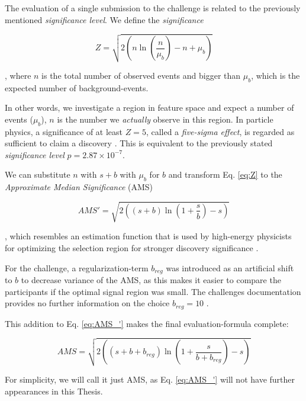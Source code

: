The evaluation of a single submission to the challenge is related to the previously mentioned \emph{significance level}.
We define the \emph{significance}

\begin{equation}\label{eq:Z}
	Z = \sqrt{2 \left(n \ln{\left( \frac{n}{\mu_b} \right)} -
	n + \mu_b \right)}
\end{equation}

, where $n$ is the total number of observed events and bigger than $\mu_b$, which is the expected number of background-events.

In other words, we investigate a region in feature space and expect a number of events ($\mu_b$), $n$ is the number we \emph{actually} observe in this region. In particle physics, a significance of at least $Z=5$, called a \emph{five-sigma effect}, is regarded as sufficient to claim a discovery \cite{higgsPaper}. This is equivalent to the previously stated \emph{significance level} $p = 2.87 \times 10^{-7}$.

We can substitute $n$ with $s+b$ with $\mu_b$ for $b$ and transform Eq. \eqref{eq:Z} to the \emph{Approximate Median Significance} (AMS)

\begin{equation}\label{eq:AMS_'}
	AMS' = \sqrt{2 \left( \left( s+b \right) \ln{ \left(1+ \frac{s}
	{b}  \right)} - s \right)}
\end{equation}

, which resembles an estimation function that is used by high-energy physicists for optimizing the selection region for stronger discovery significance \cite{higgsPaper}. 

For the challenge, a regularization-term $b_{reg}$ was introduced as an artificial shift to $b$ to decrease variance of the AMS, as this makes it easier to compare the participants if the optimal signal region was small. The challenges documentation provides no further information on the choice $b_{reg}=10$ \cite{higgsPaper}.

This addition to Eq. \eqref{eq:AMS_'} makes the final evaluation-formula complete:

\begin{equation}\label{eq:AMS}
	AMS = \sqrt{2 \left( \left( s+b+b_{reg} \right) \ln{ \left(1+ \frac{s}
	{b+b_{reg}}  \right)} - s \right)}
\end{equation}

For simplicity, we will call it just AMS, as Eq. \eqref{eq:AMS_'} will not have further appearances in this Thesis.

